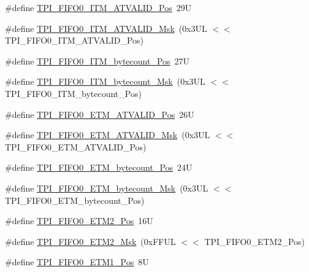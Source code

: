 \begin{DoxyCompactItemize}
\item 
\#define \hyperlink{group___c_m_s_i_s___t_p_i_gaa7e050e9eb6528241ebc6835783b6bae}{T\+P\+I\+\_\+\+F\+I\+F\+O0\+\_\+\+I\+T\+M\+\_\+\+A\+T\+V\+A\+L\+I\+D\+\_\+\+Pos}~29U
\item 
\#define \hyperlink{group___c_m_s_i_s___t_p_i_ga94cb2493ed35d2dab7bd4092b88a05bc}{T\+P\+I\+\_\+\+F\+I\+F\+O0\+\_\+\+I\+T\+M\+\_\+\+A\+T\+V\+A\+L\+I\+D\+\_\+\+Msk}~(0x3\+U\+L $<$$<$ T\+P\+I\+\_\+\+F\+I\+F\+O0\+\_\+\+I\+T\+M\+\_\+\+A\+T\+V\+A\+L\+I\+D\+\_\+\+Pos)
\item 
\#define \hyperlink{group___c_m_s_i_s___t_p_i_gac2b6f7f13a2fa0be4aa7645a47dcac52}{T\+P\+I\+\_\+\+F\+I\+F\+O0\+\_\+\+I\+T\+M\+\_\+bytecount\+\_\+\+Pos}~27U
\item 
\#define \hyperlink{group___c_m_s_i_s___t_p_i_ga07bafa971b8daf0d63b3f92b9ae7fa16}{T\+P\+I\+\_\+\+F\+I\+F\+O0\+\_\+\+I\+T\+M\+\_\+bytecount\+\_\+\+Msk}~(0x3\+U\+L $<$$<$ T\+P\+I\+\_\+\+F\+I\+F\+O0\+\_\+\+I\+T\+M\+\_\+bytecount\+\_\+\+Pos)
\item 
\#define \hyperlink{group___c_m_s_i_s___t_p_i_ga7fdeb3e465ca4aa9e3b2f424ab3bbd1d}{T\+P\+I\+\_\+\+F\+I\+F\+O0\+\_\+\+E\+T\+M\+\_\+\+A\+T\+V\+A\+L\+I\+D\+\_\+\+Pos}~26U
\item 
\#define \hyperlink{group___c_m_s_i_s___t_p_i_ga4f0005dc420b28f2369179a935b9a9d3}{T\+P\+I\+\_\+\+F\+I\+F\+O0\+\_\+\+E\+T\+M\+\_\+\+A\+T\+V\+A\+L\+I\+D\+\_\+\+Msk}~(0x3\+U\+L $<$$<$ T\+P\+I\+\_\+\+F\+I\+F\+O0\+\_\+\+E\+T\+M\+\_\+\+A\+T\+V\+A\+L\+I\+D\+\_\+\+Pos)
\item 
\#define \hyperlink{group___c_m_s_i_s___t_p_i_ga2f738e45386ebf58c4d406f578e7ddaf}{T\+P\+I\+\_\+\+F\+I\+F\+O0\+\_\+\+E\+T\+M\+\_\+bytecount\+\_\+\+Pos}~24U
\item 
\#define \hyperlink{group___c_m_s_i_s___t_p_i_gad2536b3a935361c68453cd068640af92}{T\+P\+I\+\_\+\+F\+I\+F\+O0\+\_\+\+E\+T\+M\+\_\+bytecount\+\_\+\+Msk}~(0x3\+U\+L $<$$<$ T\+P\+I\+\_\+\+F\+I\+F\+O0\+\_\+\+E\+T\+M\+\_\+bytecount\+\_\+\+Pos)
\item 
\#define \hyperlink{group___c_m_s_i_s___t_p_i_ga5f0037cc80c65e86d9e94e5005077a48}{T\+P\+I\+\_\+\+F\+I\+F\+O0\+\_\+\+E\+T\+M2\+\_\+\+Pos}~16U
\item 
\#define \hyperlink{group___c_m_s_i_s___t_p_i_gaa82a7b9b99c990fb12eafb3c84b68254}{T\+P\+I\+\_\+\+F\+I\+F\+O0\+\_\+\+E\+T\+M2\+\_\+\+Msk}~(0x\+F\+F\+U\+L $<$$<$ T\+P\+I\+\_\+\+F\+I\+F\+O0\+\_\+\+E\+T\+M2\+\_\+\+Pos)
\item 
\#define \hyperlink{group___c_m_s_i_s___t_p_i_gac5a2ef4b7f811d1f3d81ec919d794413}{T\+P\+I\+\_\+\+F\+I\+F\+O0\+\_\+\+E\+T\+M1\+\_\+\+Pos}~8U
$$
\end{DoxyCompactItemize}

